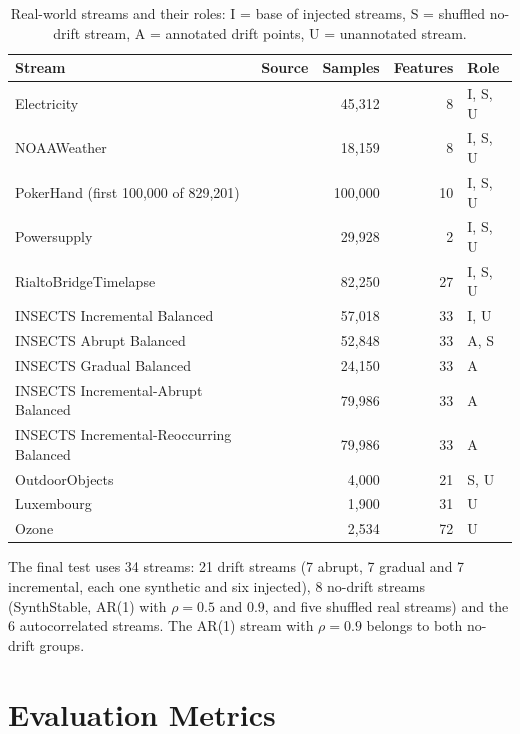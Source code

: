 \begin{table}[!htbp]
\centering
\caption[Real-world streams]{Real-world streams and their roles: I = base of injected streams, S = shuffled no-drift stream, A = annotated drift points, U = unannotated stream.}
\label{tab:real-streams}
\small
\begin{tabular}{>{\raggedright\arraybackslash}p{5.8cm}lrrl}
\toprule
Stream & Source & Samples & Features & Role \\
\midrule
Electricity & \citep{Harries1999} & 45,312 & 8 & I, S, U \\
NOAAWeather & \citep{Lukats2024} & 18,159 & 8 & I, S, U \\
PokerHand (first 100,000 of 829,201) & \citep{Lukats2024} & 100,000 & 10 & I, S, U \\
Powersupply & \citep{Lukats2024} & 29,928 & 2 & I, S, U \\
RialtoBridgeTimelapse & \citep{Lukats2024} & 82,250 & 27 & I, S, U \\
INSECTS Incremental Balanced & \citep{Souza2020} & 57,018 & 33 & I, U \\
INSECTS Abrupt Balanced & \citep{Souza2020} & 52,848 & 33 & A, S \\
INSECTS Gradual Balanced & \citep{Souza2020} & 24,150 & 33 & A \\
INSECTS Incremental-Abrupt Balanced & \citep{Souza2020} & 79,986 & 33 & A \\
INSECTS Incremental-Reoccurring Balanced & \citep{Souza2020} & 79,986 & 33 & A \\
OutdoorObjects & \citep{Lukats2024} & 4,000 & 21 & S, U \\
Luxembourg & \citep{Souza2020} & 1,900 & 31 & U \\
Ozone & \citep{Souza2020} & 2,534 & 72 & U \\
\bottomrule
\end{tabular}
\end{table}

The final test uses 34 streams: 21 drift streams (7 abrupt, 7 gradual and 7 incremental, each one synthetic and six injected), 8 no-drift streams (SynthStable, AR(1) with $\rho = 0.5$ and $0.9$, and five shuffled real streams) and the 6 autocorrelated streams. The AR(1) stream with $\rho = 0.9$ belongs to both no-drift groups.

\section{Evaluation Metrics}
\label{sec:metrics}

